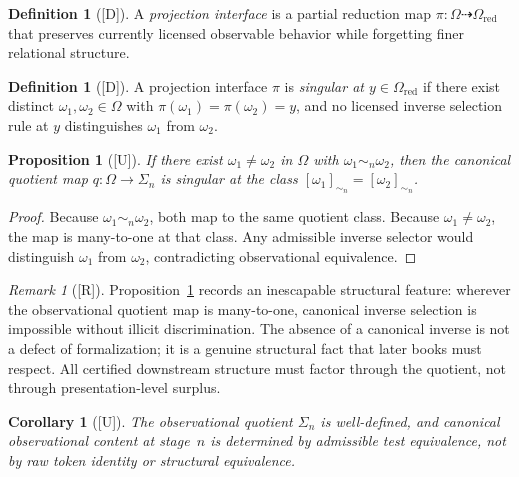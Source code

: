 \documentclass[12pt,oneside]{amsbook}
\theoremstyle{plain}
\newtheorem{proposition}[theorem]{Proposition}
\newtheorem{corollary}[theorem]{Corollary}
\theoremstyle{definition}
\newtheorem{definition}[theorem]{Definition}
\theoremstyle{remark}
\newtheorem{remark}[theorem]{Remark}
\newcommand{\status}[1]{\textup{[#1]}}
\begin{document}
\begin{definition}[\status{D}]\label{def:proj-interface}
A \emph{projection interface} is a partial reduction map
$\pi: \Omega \dashrightarrow \Omega_{\mathrm{red}}$ that preserves
currently licensed observable behavior while forgetting finer
relational structure.
\end{definition}

\begin{definition}[\status{D}]\label{def:singular-interface}
A projection interface $\pi$ is \emph{singular at $y \in
\Omega_{\mathrm{red}}$} if there exist distinct $\omega_1, \omega_2
\in \Omega$ with $\pi(\omega_1) = \pi(\omega_2) = y$, and no licensed
inverse selection rule at $y$ distinguishes $\omega_1$ from $\omega_2$.
\end{definition}

\begin{proposition}[\status{U}]\label{prop:singular}
If there exist $\omega_1 \neq \omega_2$ in $\Omega$ with $\omega_1
\sim_n \omega_2$, then the canonical quotient map
$q: \Omega \to \Sigma_n$ is singular at the class
$[\omega_1]_{\sim_n} = [\omega_2]_{\sim_n}$.
\end{proposition}

\begin{proof}
Because $\omega_1 \sim_n \omega_2$, both map to the same quotient
class.  Because $\omega_1 \neq \omega_2$, the map is many-to-one at
that class.  Any admissible inverse selector would distinguish
$\omega_1$ from $\omega_2$, contradicting observational equivalence.
\end{proof}

\begin{remark}[\status{R}]\label{rmk:singular-force}
Proposition~\ref{prop:singular} records an inescapable structural
feature: wherever the observational quotient map is many-to-one,
canonical inverse selection is impossible without illicit
discrimination.  The absence of a canonical inverse is not a defect
of formalization; it is a genuine structural fact that later books
must respect.  All certified downstream structure must factor through
the quotient, not through presentation-level surplus.
\end{remark}

\begin{corollary}[\status{U}]\label{cor:quotient-welldef}
The observational quotient $\Sigma_n$ is well-defined, and canonical
observational content at stage~$n$ is determined by admissible test
equivalence, not by raw token identity or structural equivalence.
\end{corollary}
\end{document}

